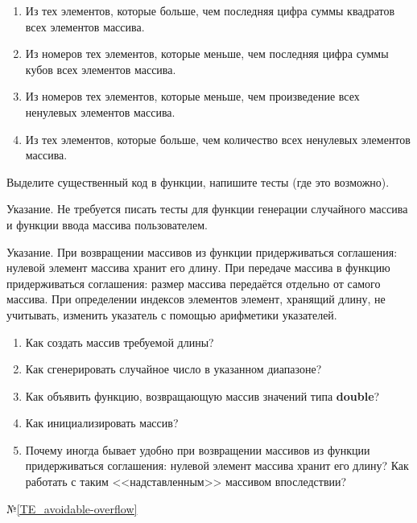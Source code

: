 \begin{enumerate}
	\item
		Из тех элементов, которые больше, чем последняя цифра суммы квадратов всех элементов массива.

	\item
		Из номеров тех элементов, которые меньше, чем последняя цифра суммы кубов всех элементов массива.

	\item
		Из номеров тех элементов, которые меньше, чем произведение всех ненулевых элементов массива.

	\item
		Из тех элементов, которые больше, чем количество всех ненулевых элементов массива.

\end{enumerate}


\labtask

Выделите существенный код в функции, напишите тесты (где это возможно).

Указание. Не требуется писать тесты для функции генерации случайного массива и функции ввода массива пользователем. 

Указание. При возвращении массивов из функции придерживаться соглашения: нулевой элемент массива хранит его длину.
При передаче массива в функцию придерживаться соглашения: размер массива передаётся отдельно от самого массива.
При определении индексов элементов элемент, хранящий длину, не учитывать, изменить указатель с помощью арифметики указателей.

\labworkquestions

\begin{enumerate}

	\item
		Как создать массив требуемой длины?
	\item
		Как сгенерировать случайное число в указанном диапазоне?
	\item
		Как объявить функцию, возвращающую массив значений типа \textbf{double}?
	\item
		Как инициализировать массив?
	\item
		Почему иногда бывает удобно при возвращении массивов из функции придерживаться соглашения: нулевой элемент массива хранит его длину?
		Как работать с таким <<надставленным>> массивом впоследствии?
\end{enumerate}

\typerrors
№\ref{TE_avoidable-overflow}


